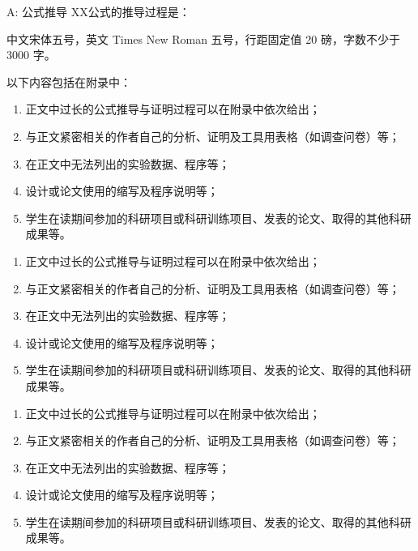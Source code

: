 \documentclass{document}
\begin{document}
\clearpage
\printbibliography




\begin{cquappendix}{A: 公式推导}
    XX公式的推导过程是：
    
    中文宋体五号，英文 Times New Roman 五号，行距固定值 20 磅，字数不少于 3000 字。
    
    以下内容包括在附录中：
    \begin{enumerate}
        \item 正文中过长的公式推导与证明过程可以在附录中依次给出；
        \item 与正文紧密相关的作者自己的分析、证明及工具用表格（如调查问卷）等；
        \item 在正文中无法列出的实验数据、程序等；
        \item 设计或论文使用的缩写及程序说明等；
        \item 学生在读期间参加的科研项目或科研训练项目、发表的论文、取得的其他科研成果等。
    \end{enumerate}

    \begin{enumerate}
        \item 正文中过长的公式推导与证明过程可以在附录中依次给出；
        \item 与正文紧密相关的作者自己的分析、证明及工具用表格（如调查问卷）等；
        \item 在正文中无法列出的实验数据、程序等；
        \item 设计或论文使用的缩写及程序说明等；
        \item 学生在读期间参加的科研项目或科研训练项目、发表的论文、取得的其他科研成果等。
    \end{enumerate}

    \begin{enumerate}
        \item 正文中过长的公式推导与证明过程可以在附录中依次给出；
        \item 与正文紧密相关的作者自己的分析、证明及工具用表格（如调查问卷）等；
        \item 在正文中无法列出的实验数据、程序等；
        \item 设计或论文使用的缩写及程序说明等；
        \item 学生在读期间参加的科研项目或科研训练项目、发表的论文、取得的其他科研成果等。
    \end{enumerate}


\end{cquappendix}
\end{document}
